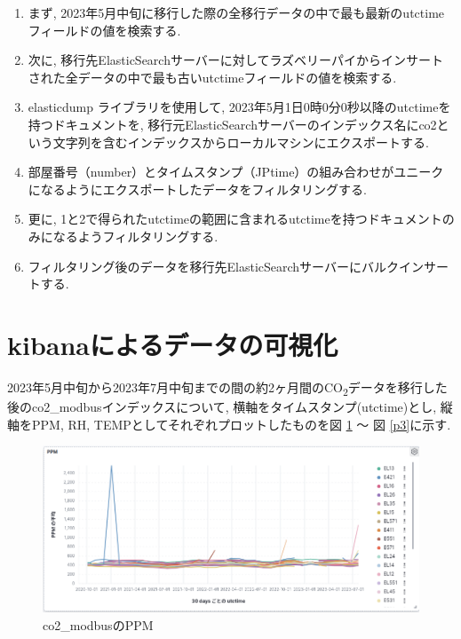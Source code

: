 \documentclass[a4j,12pt,]{jarticle}
\begin{document}
\begin{enumerate}
  \item まず, 2023年5月中旬に移行した際の全移行データの中で最も最新のutctimeフィールドの値を検索する.
  \item 次に, 移行先ElasticSearchサーバーに対してラズベリーパイからインサートされた全データの中で最も古いutctimeフィールドの値を検索する.
  \item elasticdump \cite{1}ライブラリを使用して, 2023年5月1日0時0分0秒以降のutctimeを持つドキュメントを, 移行元ElasticSearchサーバーのインデックス名にco2という文字列を含むインデックスからローカルマシンにエクスポートする.
  \item 部屋番号（number）とタイムスタンプ（JPtime）の組み合わせがユニークになるようにエクスポートしたデータをフィルタリングする.
  \item 更に, 1と2で得られたutctimeの範囲に含まれるutctimeを持つドキュメントのみになるようフィルタリングする.
  \item フィルタリング後のデータを移行先ElasticSearchサーバーにバルクインサートする.
\end{enumerate}

\section{kibanaによるデータの可視化}

2023年5月中旬から2023年7月中旬までの間の約2ヶ月間のCO\textsubscript{2}データを移行した後のco2\_modbusインデックスについて, 横軸をタイムスタンプ(utctime)とし, 縦軸をPPM, RH, TEMPとしてそれぞれプロットしたものを図 \ref{p1} 〜 図 \ref{p3}に示す.

\begin{figure}[H]
  \begin{center}
    \includegraphics[width=160mm]{ppm.png}
    \caption{co2\_modbusのPPM}
    \label{p1}
  \end{center}
\end{figure}
\end{document}
